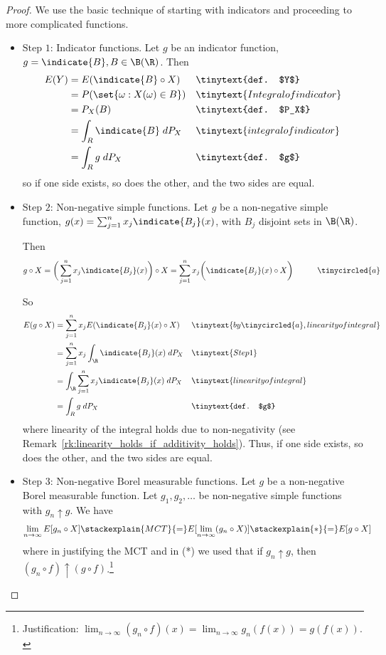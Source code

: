 \documentclass{article} %
\begin{document}
\begin{proof}
We use the basic technique of starting with indicators and proceeding to more complicated functions.

\begin{itemize}
\item $\boxed{\text{Step 1: Indicator functions.}}$  Let $g$ be an indicator function, $g=\indicate{B}, B \in \B(\R)$. Then
\begin{align*}
E(Y) &= E(\indicate{B} \circ X) && \tinytext{def. $Y$} \\
&= P(\set{\omega : X(\omega) \in B}) && \tinytext{Integral of indicator} \\
&= P_X(B) && \tinytext{def. $P_X$} \\
&= \int_R \indicate{B} \; dP_X && \tinytext{integral of indicator} \\ 
&= \int_R g \; dP_X && \tinytext{def. $g$} 
\end{align*}
 so if one side exists, so does the other, and the two sides are equal.
\item $\boxed{\text{Step 2: Non-negative simple functions.}}$  Let $g$ be a non-negative simple function, $g(x) = \sum_{j=1}^n x_j \indicate{B_j}(x)$, with $B_j$ disjoint sets in $\B(\R)$.   

Then
\[g \circ X = \bigg( \sum_{j=1}^n x_j \indicate{B_j}(x) \bigg) \circ X = \sum_{j=1}^n x_j \bigg( \indicate{B_j}(x) \circ X \bigg) \quad \quad \quad \tinycircled{a}\]

So
\begin{align*}
E(g \circ X) &= \sum_{j=1}^n x_j E(\indicate{B_j}(x) \circ X ) && \tinytext{by \tinycircled{a}, linearity of integral}	\\
&= \sum_{j=1}^n x_j \int_\R \indicate{B_j}(x) \; dP_X && \tinytext{Step 1} \\
&=  \int_\R \sum_{j=1}^n x_j \indicate{B_j}(x) \; dP_X && \tinytext{linearity of integral} \\
&= \int_R g \; dP_X && \tinytext{def. $g$}
\end{align*}
where linearity of the integral holds due to non-negativity (see Remark~\ref{rk:linearity_holds_if_additivity_holds}).    Thus, if one side exists, so does the other, and the two sides are equal.
\item $\boxed{\text{Step 3: Non-negative Borel measurable functions.}}$ Let $g$ be a non-negative Borel measurable function.  Let $g_1, g_2, \hdots$ be non-negative simple functions with $g_n \uparrow g$.  We have
\begin{align*}
\lim_{n \to \infty} E[g_n \circ X] & \stackexplain{MCT}{=} 	 E[ \lim_{n \to \infty} (g_n \circ X)] \stackexplain{*}{=} E[ g \circ X] 
\end{align*}
where in justifying the MCT and in (*) we used that if $g_n \uparrow g$, then $(g_n \circ f) \uparrow (g \circ f)$.\footnote{Justification: $\lim_{n \to \infty} (g_n \circ f) (x) = \lim_{n \to \infty} g_n(f(x)) = g(f(x)).$}   


\end{itemize}
\end{proof}
\end{document}
